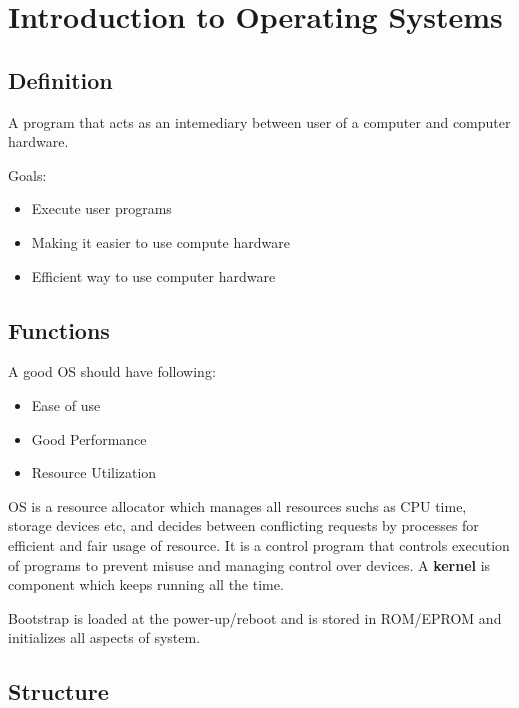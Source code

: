 \documentclass[./OperatingSystems.tex]{subfiles}
\begin{document}
\section[Introduction]{Introduction to Operating Systems}

\subsection{Definition}
A program that acts as an intemediary between user of a computer and computer hardware.

Goals:

\begin{itemize}
\item Execute user programs
\item Making it easier to use compute hardware
\item Efficient way to use computer hardware
\end{itemize}

\subsection{Functions}

\begin{mdframed}
A good OS should have following:
\begin{itemize}
\item Ease of use
\item Good Performance
\item Resource Utilization
\end{itemize}    
\end{mdframed}

OS is a resource allocator which manages all resources suchs as CPU time, storage devices etc, and decides between conflicting requests by processes for efficient and fair usage of resource.
It is a control program that controls execution of programs to prevent misuse and managing control over devices.
A \textbf{kernel} is component which keeps running all the time.

\begin{notes}
Bootstrap is loaded at the power-up/reboot and is stored in ROM/EPROM and initializes all aspects of system.
\end{notes}

\subsection{Structure}
\end{document}
